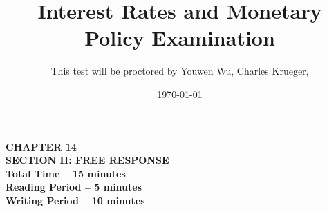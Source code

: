 

\setlength{\footskip}{1in}  %

\pagestyle{fancy}


\newcommand{\columnbreak}{{\par\vfill\null\pagebreak[4]}}


\title{Interest Rates and Monetary Policy Examination}
\author{This test will be proctored by Youwen Wu, Charles Krueger, }
\date{\today}
\maketitle





\onecolumn
\begin{adjustwidth}{1in}{1in}
  \begin{center}
    \textbf{
      CHAPTER 14 \\
      \medskip
      SECTION II: FREE RESPONSE \\
      \medskip
      Total Time -- 15 minutes \\
      \medskip
      Reading Period -- 5 minutes \\
      \medskip
      Writing Period -- 10 minutes}
  \end{center}
\end{adjustwidth}

\bigskip


\onecolumn
\sffamily
\bfseries



\large
\printbibliography


